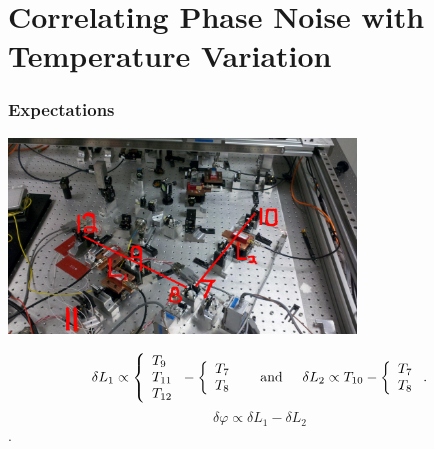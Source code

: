 \documentclass[notes, compressed, blue]{beamer}
\begin{document}
\section{Correlating Phase Noise with Temperature Variation}


\begin{frame}
\frametitle{Expectations}

    \begin{center}\includegraphics[width=3.64in]{expectations.jpg}\end{center}
$$\delta L_1 \propto \left\{\begin{array}{l} T_9 \\T_{11} \\T_{12}\end{array}\right. - \left\{\begin{array}{l} T_7 \\T_8 \end{array}\right.\hspace{.5cm}\text{and}\hspace{.5cm} \delta L_2 \propto T_{10} - \left\{\begin{array}{l} T_7 \\T_8 \end{array}\right..$$
$$\delta\varphi\propto\delta L_1-\delta L_2$$.\\

\end{frame}
\end{document}
